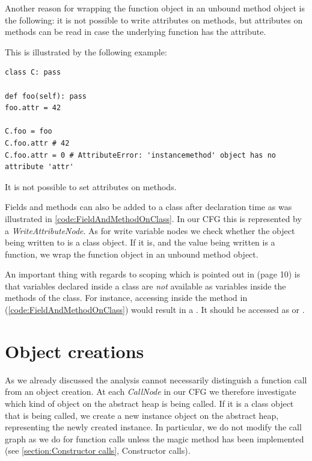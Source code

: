 Another reason for wrapping the function object in an unbound method object is the following: it is not possible to write attributes on methods, but attributes on methods can be read in case the underlying function has the attribute.

This is illustrated by the following example:

\begin{listing}[H]
	\begin{verbatim}
class C: pass

def foo(self): pass
foo.attr = 42

C.foo = foo
C.foo.attr # 42
C.foo.attr = 0 # AttributeError: 'instancemethod' object has no attribute 'attr'
	\end{verbatim}
	\caption{It is not possible to set attributes on methods.}
\end{listing}

Fields and methods can also be added to a class after declaration time as was illustrated in \autoref{code:FieldAndMethodOnClass}. In our CFG this is represented by a \textit{WriteAttributeNode}. As for write variable nodes we check whether the object being written to is a class object. If it is, and the value being written is a function, we wrap the function object in an unbound method object.

An important thing with regards to scoping which is pointed out in \cite{lamdapy} (page 10) is that variables declared inside a class are \textit{not} available as variables inside the methods of the class. For instance, accessing  inside the method  in (\autoref{code:FieldAndMethodOnClass}) would result in a . It should be accessed as  or .


\section{Object creations}
\label{section: Object creations}
As we already discussed the analysis cannot necessarily distinguish a function call from an object creation. At each \textit{CallNode} in our CFG we therefore investigate which kind of object on the abstract heap is being called. If it is a class object that is being called, we create a new instance object on the abstract heap, representing the newly created instance. In particular, we do not modify the call graph as we do for function calls unless the magic method  has been implemented (see \autoref{section:Constructor calls}, Constructor calls).

